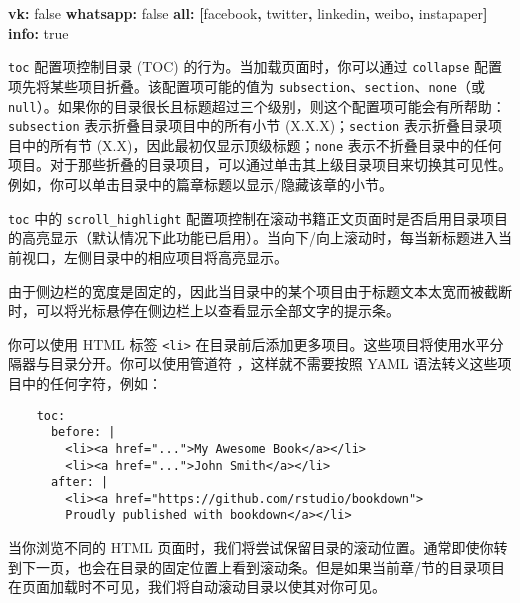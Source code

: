 \documentclass[
  12pt,
]{krantz}
\newenvironment{Shaded}{\begin{snugshade}}{\end{snugshade}}
\newcommand{\AttributeTok}[1]{\textcolor[rgb]{0.13,0.29,0.53}{#1}}
\newcommand{\CharTok}[1]{\textcolor[rgb]{0.31,0.60,0.02}{#1}}
\newcommand{\FunctionTok}[1]{\textcolor[rgb]{0.13,0.29,0.53}{\textbf{#1}}}
\newcommand{\KeywordTok}[1]{\textcolor[rgb]{0.13,0.29,0.53}{\textbf{#1}}}
\newcommand{\StringTok}[1]{\textcolor[rgb]{0.31,0.60,0.02}{#1}}
\theoremstyle{definition}
\theoremstyle{definition}
\theoremstyle{definition}
\theoremstyle{definition}
\theoremstyle{remark}
\begin{document}
\begin{Shaded}
\begin{Highlighting}[]
\AttributeTok{      }\FunctionTok{vk}\KeywordTok{:}\AttributeTok{ }\CharTok{false}
\AttributeTok{      }\FunctionTok{whatsapp}\KeywordTok{:}\AttributeTok{ }\CharTok{false}
\AttributeTok{      }\FunctionTok{all}\KeywordTok{:}\AttributeTok{ }\KeywordTok{[}\StringTok{\textquotesingle{}facebook\textquotesingle{}}\KeywordTok{,}\AttributeTok{ }\StringTok{\textquotesingle{}twitter\textquotesingle{}}\KeywordTok{,}\AttributeTok{ }\StringTok{\textquotesingle{}linkedin\textquotesingle{}}\KeywordTok{,}\AttributeTok{ }\StringTok{\textquotesingle{}weibo\textquotesingle{}}\KeywordTok{,}\AttributeTok{ }\StringTok{\textquotesingle{}instapaper\textquotesingle{}}\KeywordTok{]}
\AttributeTok{    }\FunctionTok{info}\KeywordTok{:}\AttributeTok{ }\CharTok{true}
\end{Highlighting}
\end{Shaded}

\texttt{toc} 配置项控制目录 (TOC) 的行为。当加载页面时，你可以通过 \texttt{collapse} 配置项先将某些项目折叠。该配置项可能的值为 \texttt{subsection}、\texttt{section}、\texttt{none}（或 \texttt{null}）。如果你的目录很长且标题超过三个级别，则这个配置项可能会有所帮助：\texttt{subsection} 表示折叠目录项目中的所有小节 (X.X.X)；\texttt{section} 表示折叠目录项目中的所有节 (X.X)，因此最初仅显示顶级标题；\texttt{none} 表示不折叠目录中的任何项目。对于那些折叠的目录项目，可以通过单击其上级目录项目来切换其可见性。例如，你可以单击目录中的篇章标题以显示/隐藏该章的小节。

\texttt{toc} 中的 \texttt{scroll\_highlight} 配置项控制在滚动书籍正文页面时是否启用目录项目的高亮显示（默认情况下此功能已启用）。当向下/向上滚动时，每当新标题进入当前视口，左侧目录中的相应项目将高亮显示。

由于侧边栏的宽度是固定的，因此当目录中的某个项目由于标题文本太宽而被截断时，可以将光标悬停在侧边栏上以查看显示全部文字的提示条。

你可以使用 HTML 标签 \texttt{\textless{}li\textgreater{}} 在目录前后添加更多项目。这些项目将使用水平分隔器与目录分开。你可以使用管道符 \texttt{\textbar{}}，这样就不需要按照 YAML 语法转义这些项目中的任何字符，例如：

\begin{verbatim}
    toc:
      before: |
        <li><a href="...">My Awesome Book</a></li>
        <li><a href="...">John Smith</a></li>
      after: |
        <li><a href="https://github.com/rstudio/bookdown">
        Proudly published with bookdown</a></li>
\end{verbatim}

当你浏览不同的 HTML 页面时，我们将尝试保留目录的滚动位置。通常即使你转到下一页，也会在目录的固定位置上看到滚动条。但是如果当前章/节的目录项目在页面加载时不可见，我们将自动滚动目录以使其对你可见。
\end{document}

